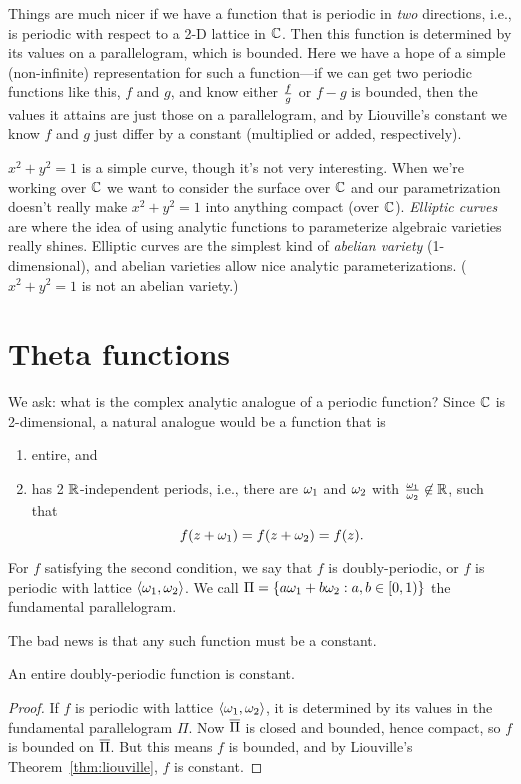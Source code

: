 Things are much nicer if we have a function that is periodic in {\it two} directions, i.e., is periodic with respect to a 2-D lattice in $\mathbb{C}$. Then this function is determined by its values on a parallelogram, which is bounded. Here we have a hope of a simple (non-infinite) representation for such a function---if we can get two periodic functions like this, $f$ and $g$, and know either $\frac{f}{g}$ or $f-g$ is bounded, then the values it attains are just those on a parallelogram, and by Liouville's constant we know $f$ and $g$ just differ by a constant (multiplied or added, respectively).

$x^2+y^2=1$ is a simple curve, though it's not very interesting. When we're working over $\mathbb{C}$ we want to consider the surface over $\mathbb{C}$ and our parametrization doesn't really make $x^2+y^2=1$ into anything compact (over $\mathbb{C}$). {\it Elliptic curves} are where the idea of using analytic functions to parameterize algebraic varieties really shines. Elliptic curves are the simplest kind of {\it abelian variety} (1-dimensional), and abelian varieties allow nice analytic parameterizations. ($x^2+y^2=1$ is not an abelian variety.)

\section{Theta functions}

We ask: what is the complex analytic analogue of a periodic function? Since $\mathbb{C}$ is 2-dimensional, a natural analogue would be a function that is
\begin{enumerate}
\item
entire, and
\item has 2 $\mathbb{R}$-independent periods, i.e., there are $\omega_1$ and $\omega_2$ with $\frac{\omega_1}{\omega_2}\not\in \mathbb{R}$, such that 
\[
f(z+\omega_1)=f(z+\omega_2)=f(z).
\]
\end{enumerate}
For $f$ satisfying the second condition, we say that $f$ is doubly-periodic, or $f$ is periodic with lattice $\left\langle {\omega_1,\omega_2}\right\rangle$. We call $\Pi=\left\{{a\omega_1+b\omega_2}:{a,b\in [0,1)}\right\}$ the fundamental parallelogram.

The bad news is that any such function must be a constant.

\begin{pr}
An entire doubly-periodic function is constant.
\end{pr}
\begin{proof}
If $f$ is periodic with lattice $\left\langle {\omega_1,\omega_2}\right\rangle$, it is determined by its values in the fundamental parallelogram $\Pi$. Now $\overline{\Pi}$ is closed and bounded, hence compact, so $f$ is bounded on $\overline{\Pi}$. But this means $f$ is bounded, and by Liouville's Theorem~\ref{thm:liouville}, $f$ is constant.
\end{proof}

